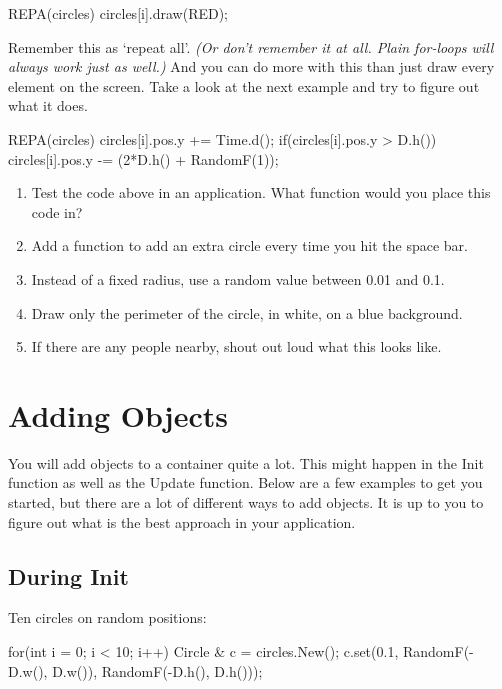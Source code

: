 \begin{code}
REPA(circles)
{
  circles[i].draw(RED);
}
\end{code}

Remember this as `repeat all'. \textit{(Or don't remember it at all. Plain for-loops will always work just as well.)} And you can do more with this than just draw every element on the screen. Take a look at the next example and try to figure out what it does.

\begin{code}
REPA(circles)
{
	circles[i].pos.y += Time.d();
	if(circles[i].pos.y > D.h()) {
	  circles[i].pos.y -= (2*D.h() + RandomF(1));
	}
}
\end{code}

\begin{exercise}
\begin{enumerate}
\item Test the code above in an application. What function would you place this code in?
\item Add a function to add an extra circle every time you hit the space bar.
\item Instead of a fixed radius, use a random value between 0.01 and 0.1.
\item Draw only the perimeter of the circle, in white, on a blue background.
\item If there are any people nearby, shout out loud what this looks like.
\end{enumerate}
\end{exercise}

\section{Adding Objects}
You will add objects to a container quite a lot. This might happen in the Init function as well as the Update function. Below are a few examples to get you started, but there are a lot of different ways to add objects. It is up to you to figure out what is the best approach in your application.

\subsection{During Init}

Ten circles on random positions:

\begin{code}
for(int i = 0; i < 10; i++)
{
	Circle & c = circles.New();
	c.set(0.1, RandomF(-D.w(), D.w()), RandomF(-D.h(), D.h()));
}
\end{code}

